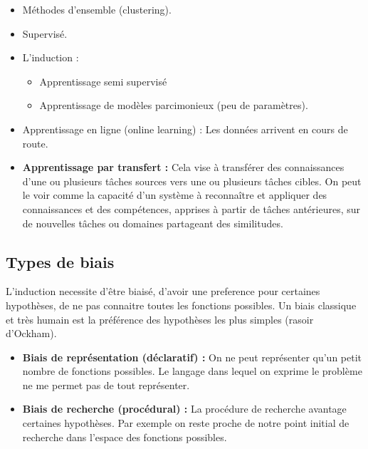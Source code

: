 \documentclass{article}
\begin{document}
\begin{itemize}

\item Méthodes d'ensemble (clustering).

\item Supervisé.

\item L'induction :
    \begin{itemize}
    \item Apprentissage semi supervisé 
    \item Apprentissage de modèles parcimonieux (peu de paramètres).
    \end{itemize}

\item Apprentissage en ligne (online learning) : Les données arrivent en cours de route.

\item \textbf{Apprentissage par transfert :} Cela vise à transférer des connaissances d'une ou plusieurs tâches sources vers une ou plusieurs tâches cibles. On peut le voir comme la capacité d’un système à reconnaître et appliquer des connaissances et des compétences, apprises à partir de tâches antérieures, sur de nouvelles tâches ou domaines partageant des similitudes.

\end{itemize}

\subsection{Types de biais}

L'induction necessite d'être biaisé, d'avoir une preference pour certaines hypothèses, de ne pas connaitre toutes les fonctions possibles. Un biais classique et très humain est la préférence des hypothèses les plus simples (rasoir d'Ockham).

\begin{itemize}
\item \textbf{Biais de représentation (déclaratif) :} On ne peut représenter qu'un petit nombre de fonctions possibles. Le langage dans lequel on exprime le problème ne me permet pas de tout représenter.
\item \textbf{Biais de recherche (procédural) :} La procédure de recherche avantage certaines hypothèses. Par exemple on reste proche de notre point initial de recherche dans l'espace des fonctions possibles.
\end{itemize}
\end{document}
